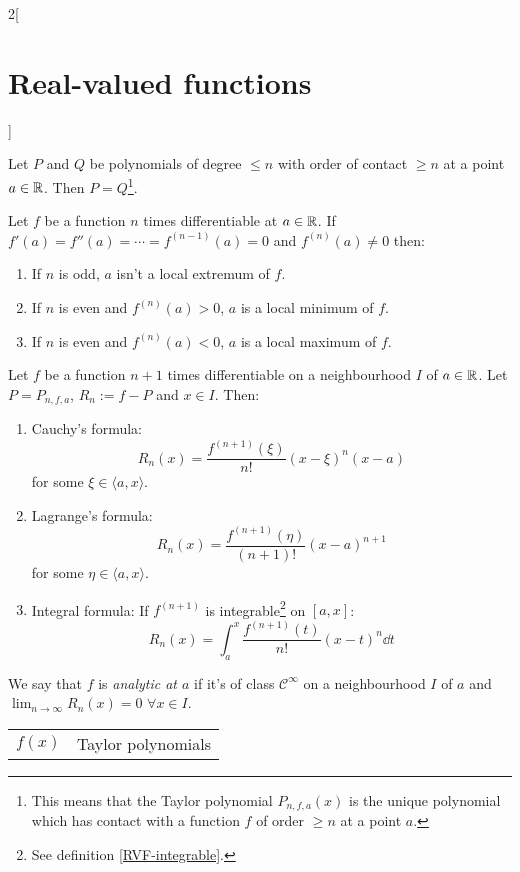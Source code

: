 \documentclass[../../../main.tex]{subfiles}
\begin{document}
\begin{multicols}{2}[\section{Real-valued functions}]
\begin{theorem}
\end{theorem}
\begin{prop}
    Let $P$ and $Q$ be polynomials of degree $\leq n$ with order of contact $\geq n$ at a point $a\in\mathbb{R}$. Then $P=Q$\footnote{This means that the Taylor polynomial $P_{n,f,a}(x)$ is the unique polynomial which has contact with a function $f$ of order $\geq n$ at a point $a$.}.
\end{prop}
\begin{theorem}
    Let $f$ be a function $n$ times differentiable at $a\in\mathbb{R}$. If $f'(a)=f''(a)=\cdots=f^{(n-1)}(a)=0$ and $f^{(n)}(a)\ne 0$ then:
    \begin{enumerate}
        \item If $n$ is odd, $a$ isn't a local extremum of $f$.
        \item If $n$ is even and $f^{(n)}(a)>0$, $a$ is a local minimum of $f$.
        \item If $n$ is even and $f^{(n)}(a)<0$, $a$ is a local maximum of $f$.
    \end{enumerate}
\end{theorem}
\begin{theorem}
    Let $f$ be a function $n+1$ times differentiable on a neighbourhood $I$ of $a\in\mathbb{R}$. Let $P=P_{n,f,a}$, $R_n:=f-P$ and $x\in I$. Then:
    \begin{enumerate}
        \item Cauchy's formula: $$R_n(x)=\frac{f^{(n+1)}(\xi)}{n!}{(x-\xi)}^n(x-a)$$ for some $\xi\in\langle a,x\rangle$.
        \item Lagrange's formula: $$R_n(x)=\frac{f^{(n+1)}(\eta)}{(n+1)!}{(x-a)}^{n+1}$$ for some $\eta\in\langle a,x\rangle$.
        \item Integral formula: If $f^{(n+1)}$ is integrable\footnote{See definition \ref{RVF-integrable}.} on $[a,x]$: $$R_n(x)=\int_a^x\frac{f^{(n+1)}(t)}{n!}{(x-t)}^n\dd t$$
    \end{enumerate}
\end{theorem}
\begin{definition}
    We say that $f$ is \textit{analytic at $a$} if it's of class $\mathcal{C}^\infty$ on a neighbourhood $I$ of $a$ and $\displaystyle\lim_{n\to\infty}R_n(x)=0$  $\forall x\in I$.
\end{definition}
\begin{center}
    \renewcommand*{\arraystretch}{2}
    \begin{tabular}{|c|>{\centering\arraybackslash}m{6.5cm}|}
        \hline
        $f(x)$ & Taylor polynomials  \\

\end{tabular}
\end{center}
\end{multicols}
\end{document}
